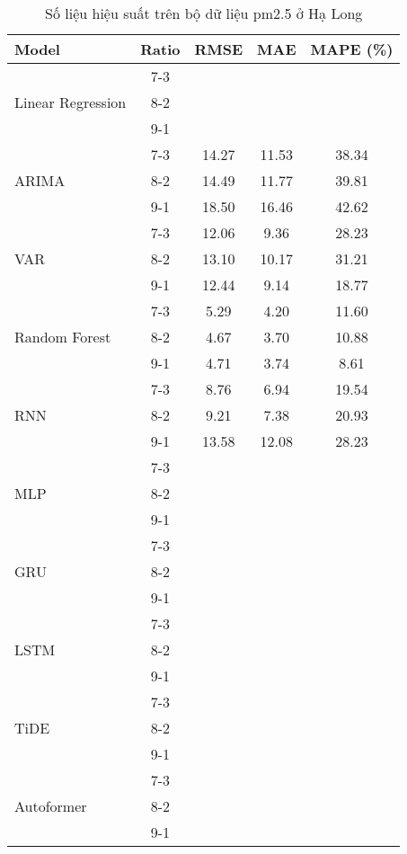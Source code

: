 \begin{table}[h!]
    \centering
    \caption{Số liệu hiệu suất trên bộ dữ liệu pm2.5 ở Hạ Long}
    \begin{tabular}{|l|c|c|c|c|}
    \hline
    \rowcolor{orange!30} \textbf{Model} & \textbf{Ratio} & \textbf{RMSE} & \textbf{MAE} & \textbf{MAPE (\%)} \\ \hline
    \rowcolor{white} & 7-3 &  &  &  \\ 
    \rowcolor{white} Linear Regression & 8-2 &  &  &  \\ 
    \rowcolor{white} & 9-1 &  &  &  \\ \hline
    \rowcolor{white}  & 7-3 & 14.27 & 11.53 & 38.34 \\ 
    \rowcolor{white} ARIMA & 8-2 & 14.49 & 11.77 & 39.81 \\ 
    \rowcolor{white}  & 9-1 & 18.50 & 16.46 & 42.62 \\ \hline
    \rowcolor{white}  & 7-3 & 12.06 & 9.36 & 28.23 \\
    \rowcolor{white} VAR & 8-2 & 13.10 & 10.17 & 31.21 \\ 
    \rowcolor{white}  & 9-1 & 12.44 & 9.14 & 18.77 \\ \hline
    \rowcolor{white} & 7-3 & 5.29 & 4.20 & 11.60 \\ 
    \rowcolor{white} Random Forest & 8-2 & 4.67 & 3.70 & 10.88 \\ 
    \rowcolor{white} & 9-1 & 4.71 & 3.74 & 8.61 \\ \hline
    \rowcolor{white}  & 7-3 & 8.76 & 6.94 & 19.54 \\ 
    \rowcolor{white} RNN & 8-2 & 9.21 & 7.38 & 20.93 \\ 
    \rowcolor{white}  & 9-1 & 13.58 & 12.08 & 28.23 \\ \hline
    \rowcolor{white} & 7-3 &  &  &  \\ 
    \rowcolor{white} MLP & 8-2 &  &  &  \\ 
    \rowcolor{white} & 9-1 &  &  &  \\ \hline
    \rowcolor{white} & 7-3 &  &  &  \\ 
    \rowcolor{white} GRU & 8-2 &  &  &  \\ 
    \rowcolor{white} & 9-1 &  &  &  \\ \hline
    \rowcolor{white} & 7-3 &  &  &  \\ 
    \rowcolor{white} LSTM & 8-2 &  &  &  \\ 
    \rowcolor{white} & 9-1 &  &  &  \\ \hline
    \rowcolor{white!30} & 7-3 &  &  &  \\ 
    \rowcolor{white!30} TiDE & 8-2 &  &  &  \\ 
    \rowcolor{white!30} & 9-1 &  &  &  \\ \hline
    \rowcolor{white} & 7-3 &  &  &  \\ 
    \rowcolor{white} Autoformer & 8-2 &  &  &  \\ 
    \rowcolor{white} & 9-1 &  &  &  \\ \hline

    \end{tabular}
\end{table}